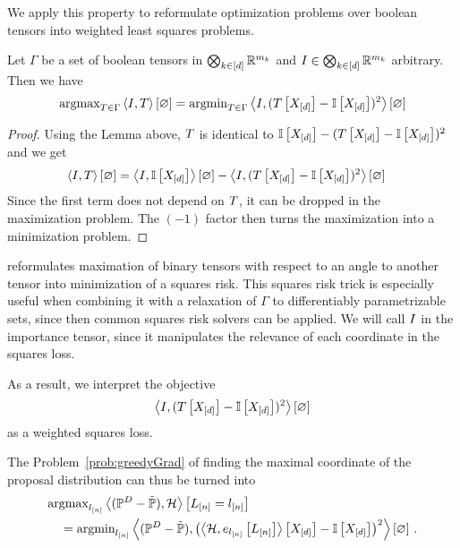 We apply this property to reformulate optimization problems over boolean tensors into weighted least squares problems.

\begin{theorem}\label{the:reweightedLeastSquares}
	Let $\Gamma$ be a set of boolean tensors in $\bigotimes_{k\in[d]} \mathbb{R}^{m_{k}}$ and $I\in\bigotimes_{k\in[d]} \mathbb{R}^{m_{k}}$ arbitrary.
	Then we have
	\begin{align}
		\mathrm{argmax}_{T\in\Gamma} \left\langle I,T\right\rangle \left[ \varnothing \right] 
		= \mathrm{argmin}_{T\in\Gamma} \left\langle I, (T\left[X_{[d]}\right]-\mathbb{I}\left[X_{[d]}\right])^2\right\rangle \left[ \varnothing \right]
	\end{align} 
\end{theorem}
\begin{proof}
	Using the Lemma above, $T$ is identical to $\mathbb{I}\left[X_{[d]}\right]-(T\left[X_{[d]}\right]-\mathbb{I}\left[X_{[d]}\right])^2$ and we get
	\begin{align*}
		 \left\langle I,T\right\rangle \left[ \varnothing \right] 
		 &=  \left\langle I,\mathbb{I}\left[X_{[d]}\right]\right\rangle \left[ \varnothing \right]-\left\langle I,(T\left[X_{[d]}\right]-\mathbb{I}\left[X_{[d]}\right])^2\right\rangle \left[ \varnothing \right] 
	\end{align*}
	Since the first term does not depend on $T$, it can be dropped in the maximization problem.
	The $(-1)$ factor then turns the maximization into a minimization problem.
\end{proof}

 reformulates maximation of binary tensors with respect to an angle to another tensor into minimization of a squares risk.
This squares risk trick is especially useful when combining it with a relaxation of $\Gamma$ to differentiably parametrizable sets, since then common squares risk solvers can be applied.
We will call $I$ in the  importance tensor, since it manipulates the relevance of each coordinate in the squares loss.

%
As a result, we interpret the objective
	\[ \left\langle I, (T\left[X_{[d]}\right]-\mathbb{I}\left[X_{[d]}\right])^2\right\rangle \left[ \varnothing \right] \]
as a weighted squares loss.

\begin{example}
	The Problem~\ref{prob:greedyGrad} of finding the maximal coordinate of the proposal distribution can thus be turned into
	\begin{align*}
		&\mathrm{argmax}_{l_{[n]}} \left\langle (\mathbb{P}^{D}-\tilde{\mathbb{P}}),\mathcal{H}\right\rangle \left[ L_{[n]}=l_{[n]} \right]  \\
		&\quad = \mathrm{argmin}_{l_{[n]}} \left\langle (\mathbb{P}^{D}-\tilde{\mathbb{P}}),
		\left(\left\langle \mathcal{H},e_{l_{[n]}}\left[L_{[n]}\right]\right\rangle \left[ X_{[d]} \right]-\mathbb{I}\left[X_{[d]}\right]\right)^2\right\rangle \left[ \varnothing \right] \, . 
	\end{align*}
\end{example}


